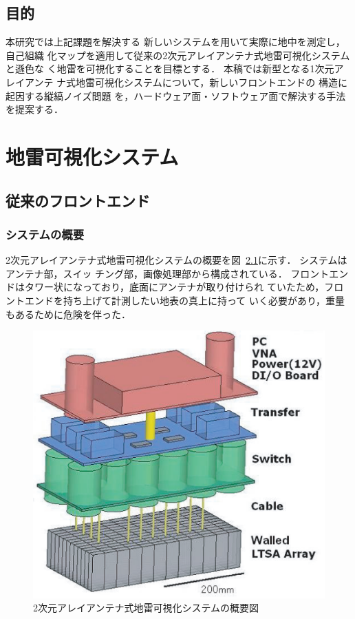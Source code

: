 ﻿\documentclass[12pt,oneside]{jsbook}
\begin{document}
\section{目的}
本研究では上記課題を解決する
新しいシステムを用いて実際に地中を測定し，自己組織
化マップを適用して従来の2次元アレイアンテナ式地雷可視化システムと遜色な
く地雷を可視化することを目標とする．
本稿では新型となる1次元アレイアンテ
ナ式地雷可視化システムについて，新しいフロントエンドの
構造に起因する縦縞ノイズ問題
を，ハードウェア面・ソフトウェア面で解決する手法を提案する．

\newpage
\chapter{地雷可視化システム}
\section{従来のフロントエンド}
\subsection{システムの概要}
2次元アレイアンテナ式地雷可視化システムの概要を図~\ref{pic:const_ov}に示す．
システムはアンテナ部，スイッ
チング部，画像処理部から構成されている．
フロントエンドはタワー状になっており，底面にアンテナが取り付けられ
ていたため，フロントエンドを持ち上げて計測したい地表の真上に持って
いく必要があり，重量もあるために危険を伴った．
\begin{figure}[hbtp]
\begin{center}
\includegraphics[width = \hsize]{so1.eps}
\caption{2次元アレイアンテナ式地雷可視化システムの概要図} \label{pic:const_ov} 
\end{center}
\end{figure}
\end{document}

